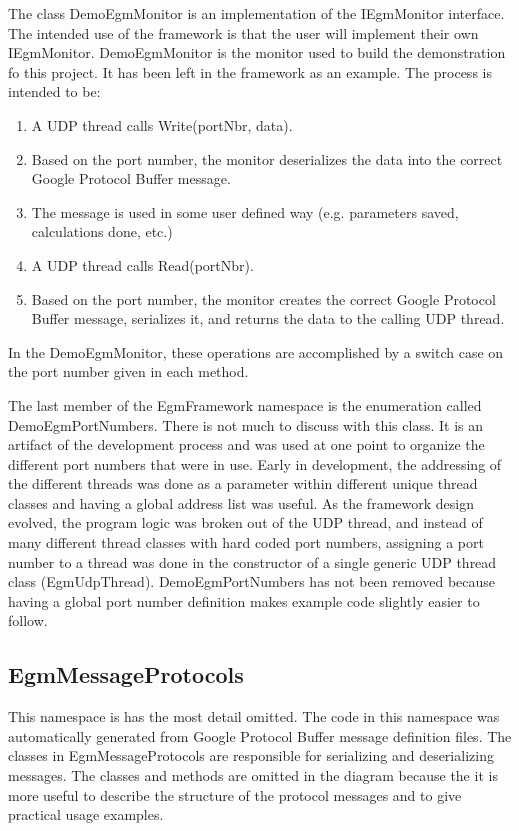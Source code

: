 \documentclass{cslthse-msc}
\begin{document}
The class DemoEgmMonitor is an implementation of the IEgmMonitor interface. The intended use of the framework is that the user will implement their own IEgmMonitor. DemoEgmMonitor is the monitor used to build the demonstration fo this project. It has been left in the framework as an example. The process is intended to be:
\begin{enumerate}
    \item A UDP thread calls Write(portNbr, data).
    \item Based on the port number, the monitor deserializes the data into the correct Google Protocol Buffer message.
    \item The message is used in some user defined way (e.g. parameters saved, calculations done, etc.)
    \item A UDP thread calls Read(portNbr).
    \item Based on the port number, the monitor creates the correct Google Protocol Buffer message, serializes it, and returns the data to the calling UDP thread.
\end{enumerate}
In the DemoEgmMonitor, these operations are accomplished by a switch case on the port number given in each method. \par

The last member of the EgmFramework namespace is the enumeration called DemoEgmPortNumbers. There is not much to discuss with this class. It is an artifact of the development process and was used at one point to organize the different port numbers that were in use. Early in development, the addressing of the different threads was done as a parameter within different unique thread classes and having a global address list was useful. As the framework design evolved, the program logic was broken out of the UDP thread, and instead of many different thread classes with hard coded port numbers, assigning a port number to a thread was done in the constructor of a single generic UDP thread class (EgmUdpThread). DemoEgmPortNumbers has not been removed because having a global port number definition makes example code slightly easier to follow. 

\subsection{EgmMessageProtocols}
\label{sec:Result:LthRobotStudio:EgmMessageProtocols}
This namespace is has the most detail omitted. The code in this namespace was automatically generated from Google Protocol Buffer message definition files. The classes in EgmMessageProtocols are responsible for serializing and deserializing messages. The classes and methods are omitted in the diagram because the it is more useful to describe the structure of the protocol messages and to give practical usage examples.\par
\end{document}
